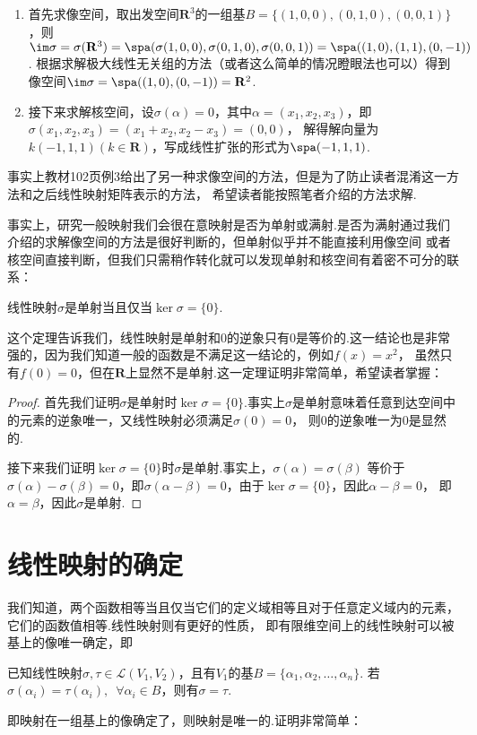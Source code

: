 \begin{solution}
\begin{enumerate}
    \item 首先求像空间，取出发空间$\mathbf{R}^3$的一组基$B=\{(1,0,0),(0,1,0),(0,0,1)\}$，则
    $\im \sigma=\sigma(\mathbf{R}^3)=\spa(\sigma(1,0,0),\sigma(0,1,0),\sigma(0,0,1))=\spa((1,0),(1,1),(0,-1))$.
    根据求解极大线性无关组的方法（或者这么简单的情况瞪眼法也可以）得到像空间$\im \sigma=\spa((1,0),(0,-1))=\mathbf{R}^2$.
    \item 接下来求解核空间，设$\sigma(\alpha)=0$，其中$\alpha=(x_1,x_2,x_3)$，即$\sigma(x_1,x_2,x_3)=(x_1+x_2,x_2-x_3)=(0,0)$，
    解得解向量为$k(-1,1,1)(k\in\mathbf{R})$，写成线性扩张的形式为$\spa(-1,1,1)$.
\end{enumerate}
\end{solution}

事实上教材102页例3给出了另一种求像空间的方法，但是为了防止读者混淆这一方法和之后线性映射矩阵表示的方法，
希望读者能按照笔者介绍的方法求解.

事实上，研究一般映射我们会很在意映射是否为单射或满射.是否为满射通过我们介绍的求解像空间的方法是很好判断的，但单射似乎并不能直接利用像空间
或者核空间直接判断，但我们只需稍作转化就可以发现单射和核空间有着密不可分的联系：
\begin{theorem}
    线性映射$\sigma$是单射当且仅当$\ker \sigma=\{0\}$.
\end{theorem}
这个定理告诉我们，线性映射是单射和0的逆象只有0是等价的.这一结论也是非常强的，因为我们知道一般的函数是不满足这一结论的，例如$f(x)=x^2$，
虽然只有$f(0)=0$，但在$\mathbf{R}$上显然不是单射.这一定理证明非常简单，希望读者掌握：

\begin{proof}
    首先我们证明$\sigma$是单射时$\ker\sigma=\{0\}$.事实上$\sigma$是单射意味着任意到达空间中的元素的逆象唯一，又线性映射必须满足$\sigma(0)=0$，
    则0的逆象唯一为0是显然的.

    接下来我们证明$\ker \sigma=\{0\}$时$\sigma$是单射.事实上，$\sigma(\alpha)=\sigma(\beta)$
    等价于$\sigma(\alpha)-\sigma(\beta)=0$，即$\sigma(\alpha-\beta)=0$，由于$\ker \sigma=\{0\}$，因此$\alpha-\beta=0$，
    即$\alpha=\beta$，因此$\sigma$是单射.
\end{proof}

\section{线性映射的确定}
我们知道，两个函数相等当且仅当它们的定义域相等且对于任意定义域内的元素，它们的函数值相等.线性映射则有更好的性质，
即有限维空间上的线性映射可以被基上的像唯一确定，即
\begin{theorem}\label{thm:5:线性映射唯一确定}
    已知线性映射$\sigma,\tau\in \mathcal{L}(V_1,V_2)$，且有$V_1$的基$B=\{\alpha_1,\alpha_2,\ldots,\alpha_n\}$.
    若$\sigma(\alpha_i)=\tau(\alpha_i),\enspace\forall \alpha_i \in B$，则有$\sigma=\tau$.
\end{theorem}
即映射在一组基上的像确定了，则映射是唯一的.证明非常简单：

